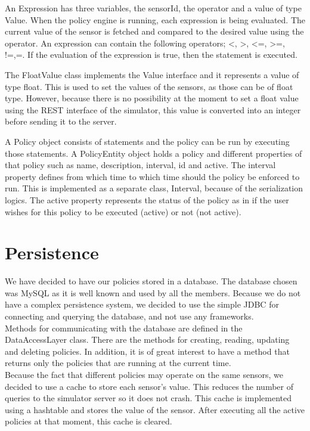 An Expression has three variables, the sensorId, the operator and a value of type Value. When the policy engine is running, each expression is being evaluated. The current value of the sensor is fetched and compared to the desired value using the operator. An expression can contain the following operators; <, >, <=, >=, !=,=. 
If the evaluation of the expression is true, then the statement is executed.

The FloatValue class implements the Value interface and it represents a value of type float. This is used to set the values of the sensors, as those can be of float type. However, because there is no possibility at the moment to set a float value using the REST interface of the simulator, this value is converted into an integer before sending it to the server.

A Policy object consists of statements and the policy can be run by executing those statements. A PolicyEntity object holds a policy and different properties of that policy such as name, description, interval, id and active. The interval property defines from which time to which time should the policy be enforced to run. This is implemented as a separate class, Interval, because of the serialization logics.  The active property represents the status of the policy as in if the user wishes for this policy to be executed (active) or not (not active).
\section{Persistence}
We have decided to have our policies stored in a database. The database chosen was MySQL as it is well known and used by all the members. Because we do not have a complex persistence system, we decided to use the simple JDBC for connecting and querying the database, and not use any frameworks. 
\\Methods for communicating with the database are defined in the DataAccessLayer class. There are the methods for creating, reading, updating and deleting policies. In addition, it is of great interest to have a method that returns only the policies that are running at the current time. 
\\Because the fact that different policies may operate on the same sensors, we decided to use a cache to store each sensor's value. This reduces the number of queries to the simulator server so it does not crash. This cache is implemented using a hashtable and stores the value of the sensor. After executing all the active policies at that moment, this cache is cleared. 
